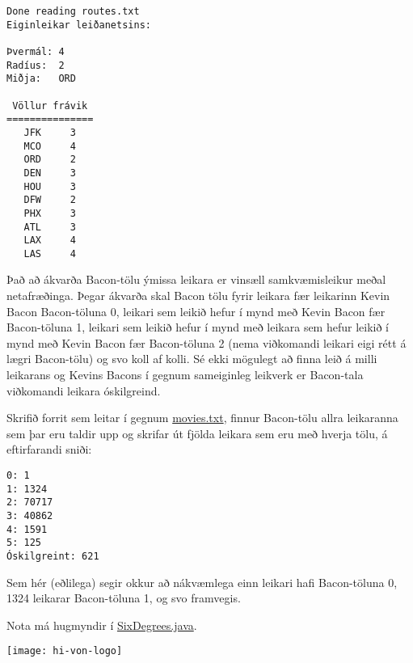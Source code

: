 \documentclass{article}
\begin{document}
\begin{verbatim}
Done reading routes.txt
Eiginleikar leiðanetsins:

Þvermál: 4
Radíus:  2
Miðja:   ORD

 Völlur frávik 
===============
   JFK     3   
   MCO     4   
   ORD     2   
   DEN     3   
   HOU     3   
   DFW     2   
   PHX     3   
   ATL     3   
   LAX     4   
   LAS     4  
\end{verbatim}

\question
Það að ákvarða Bacon-tölu ýmissa leikara er vinsæll samkvæmisleikur meðal netafræðinga. Þegar ákvarða skal Bacon tölu fyrir leikara fær leikarinn Kevin Bacon Bacon-töluna 0, leikari sem leikið hefur í mynd með Kevin Bacon fær Bacon-töluna 1, leikari sem leikið hefur í mynd með leikara sem hefur leikið í mynd með Kevin Bacon fær Bacon-töluna 2 (nema viðkomandi leikari eigi rétt á lægri Bacon-tölu) og svo koll af kolli. Sé ekki mögulegt að finna leið á milli leikarans og Kevins Bacons í gegnum sameiginleg leikverk er Bacon-tala viðkomandi leikara óskilgreind.

Skrifið forrit sem leitar í gegnum \href{https://raw.githubusercontent.com/Ernir/kennsluefni/master/T2/Code/w11/movies.txt}{movies.txt}, finnur Bacon-tölu allra leikaranna sem þar eru taldir upp og skrifar út fjölda leikara sem eru með hverja tölu, á eftirfarandi sniði:

\begin{verbatim}
0: 1
1: 1324
2: 70717
3: 40862
4: 1591
5: 125
Óskilgreint: 621
\end{verbatim}

Sem hér (eðlilega) segir okkur að nákvæmlega einn leikari hafi Bacon-töluna 0, 1324 leikarar Bacon-töluna 1, og svo framvegis.

Nota má hugmyndir í \href{https://github.com/Ernir/kennsluefni/tree/master/T2/Code/w11/SixDegrees.java}{SixDegrees.java}.

\vfill
\texttt{[image: hi-von-logo]}
\end{document}
